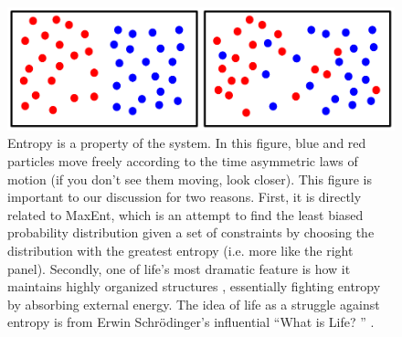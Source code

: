 \documentclass[letterpaper,12pt]{article}
\begin{document}
\begin{figure}[h!]
  \centering\includegraphics[width=1.0\textwidth]{fig1.pdf}

  \caption{Entropy is a property of the system. In this figure, blue and red
  particles move freely according to the time asymmetric laws of motion (if
  you don't see them moving, look closer). This figure is important to our
  discussion for two reasons. First, it is directly related to MaxEnt, which
  is an attempt to find the least biased probability distribution given a
  set of constraints by choosing the distribution with the greatest entropy
  (i.e. more like the right panel). Secondly, one of life's most dramatic
  feature is how it maintains highly organized structures \cite
  {dro01b,sel05,gol11}, essentially fighting entropy by absorbing external
  energy. The idea of life as a struggle against entropy is from Erwin Schr\"
  odinger's influential ``What is Life? '' \cite{sch44}.}

  \label{fig:entropy}
\end{figure}
\end{document}
